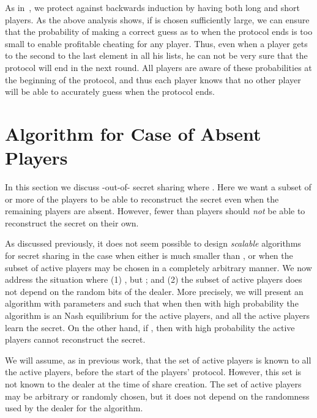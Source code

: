 \documentclass[12pt]{article}
\theoremstyle{definition}
\begin{document}
As in~\cite{kol2008games}, we protect against backwards induction by
having both long and short players.  As the above analysis shows, if
 is chosen sufficiently large, we can ensure that the probability
of making a correct guess as to when the protocol ends is too small to
enable profitable cheating for any player.  Thus, even when a player
gets to the second to the last element in all his lists, he can not be
very sure that the protocol will end in the next round.  All players
are aware of these probabilities at the beginning of the protocol, and
thus each player knows that no other player will be able to accurately
guess when the protocol ends.


\section{Algorithm for Case of Absent Players}
\label{s:mofn}


In this section we discuss -out-of- secret sharing where . Here we want a subset of  or more of the players to be able to
reconstruct the secret even when the remaining players are absent. 
However, fewer than  players should \emph{not} be able to
reconstruct the secret on their own.

As discussed previously, it does
not seem possible to design \emph{scalable} algorithms for secret
sharing in the case when either  is much smaller than , or when the
subset of  active players may be chosen in a completely
arbitrary manner.  We now address the situation where (1) ,
but ; and (2) the subset of active players does not
depend on the random bits of the dealer.  More precisely, we will
present an algorithm with parameters  and  such that when  then with high
probability the algorithm is an Nash equilibrium for the
active players, and all the active players learn the secret. On the
other hand, if ,
then with high probability the active players cannot reconstruct the
secret.

We will assume, as in previous work, that the set of active players is
known to all the active players, before the start of the
players' protocol. However, this set is not known to the dealer at the time of 
share creation.   The set of active players may be arbitrary or randomly 
chosen, but it does
not depend on the randomness used by the dealer for the algorithm.
\end{document}
